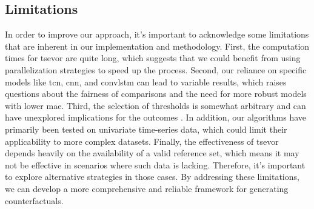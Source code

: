\subsection{Limitations}
In order to improve our approach, it's important to acknowledge some limitations that are inherent in our implementation and methodology. First, the computation times for \gls{tsevor} are quite long, which suggests that we could benefit from using parallelization strategies to speed up the process. Second, our reliance on specific models like \gls{tcn}, \gls{cnn}, and \gls{convlstm} can lead to variable results, which raises questions about the fairness of comparisons and the need for more robust models \cite{hamman_robust_2024} with lower \gls{mae}. Third, the selection of thresholds is somewhat arbitrary and can have unexplored implications for the outcomes \cite{spooner_counterfactual_2021}. In addition, our algorithms have primarily been tested on univariate time-series data, which could limit their applicability to more complex datasets. Finally, the effectiveness of \gls{tsevor} depends heavily on the availability of a valid reference set, which means it may not be effective in scenarios where such data is lacking. Therefore, it's important to explore alternative strategies in those cases. By addressing these limitations, we can develop a more comprehensive and reliable framework for generating counterfactuals.

